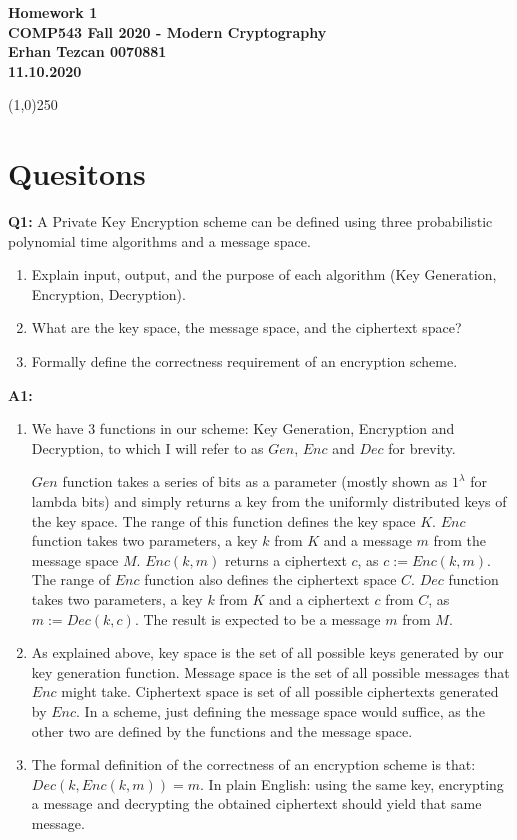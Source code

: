 \documentclass[12pt,reqno]{amsart}
\begin{document}
\begin{center}
\large\textbf{Homework 1 \\ COMP543 Fall 2020 - Modern Cryptography \\}
\normalsize\textbf{ Erhan Tezcan 0070881 \\ 11.10.2020} \\
\end{center}

\begin{center}
\line(1,0){250}
\end{center}

\section{Quesitons}

\textbf{Q1:} A Private Key Encryption scheme can be defined using three probabilistic polynomial time algorithms and a message space.
\begin{enumerate}[label=\alph*]
\item Explain input, output, and the purpose of each algorithm (Key Generation, Encryption, Decryption). 
\item What are the key space, the message space, and the ciphertext space?
\item Formally define the   correctness   requirement of an encryption scheme.
\end{enumerate}

\textbf{A1:}
\begin{enumerate}[label=\alph*]
\item We have 3 functions in our scheme: Key Generation, Encryption and Decryption, to which I will refer to as $Gen$, $Enc$ and $Dec$ for brevity.﻿﻿﻿﻿﻿ 

$Gen$ function takes a series of bits as a parameter (mostly shown as $1^{\lambda}$ for lambda bits) and simply returns a key from the uniformly distributed keys of the key space. The range of this function defines the key space $K$.
$Enc$ function takes two parameters, a key $k$ from $K$ and a message $m$ from the message space $M$. $Enc(k,m)$ returns a ciphertext $c$, as $c := Enc(k,m)$. The range of $Enc$ function also defines the ciphertext space $C$. 
$Dec$ function takes two parameters, a key $k$ from $K$ and a ciphertext $c$ from $C$, as $m := Dec(k,c)$. The result is expected to be a message $m$ from $M$. 

\item As explained above, key space is the set of all possible keys generated by our key generation function. Message space is the set of all possible messages that $Enc$ might take. Ciphertext space is set of all possible ciphertexts generated by $Enc$. In a scheme, just defining the message space would suffice, as the other two are defined by the functions and the message space.
\item The formal definition of the correctness of an encryption scheme is that: $Dec(k,Enc(k,m)) = m$. In plain English: using the same key, encrypting a message and decrypting the obtained ciphertext should yield that same message.
\end{enumerate} 
\end{document}
